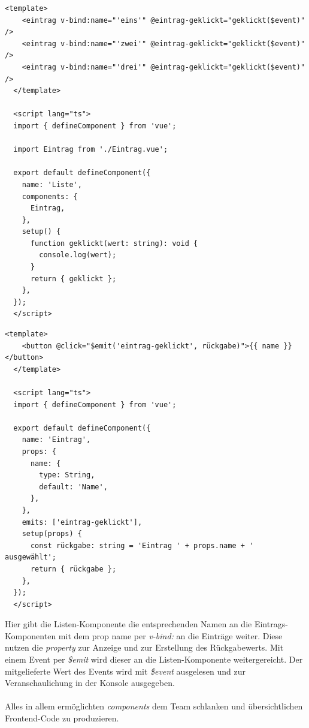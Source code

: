 \documentclass[10pt, a4paper]{article}
\begin{document}
\begin{lstlisting}[caption={beispielhafte Listen-Komponente (Liste.vue)}, captionpos=b, label=lst:Liste]
  <template>
    <eintrag v-bind:name="'eins'" @eintrag-geklickt="geklickt($event)" />
    <eintrag v-bind:name="'zwei'" @eintrag-geklickt="geklickt($event)" />
    <eintrag v-bind:name="'drei'" @eintrag-geklickt="geklickt($event)" />
  </template>

  <script lang="ts">
  import { defineComponent } from 'vue';

  import Eintrag from './Eintrag.vue';

  export default defineComponent({
    name: 'Liste',
    components: {
      Eintrag,
    },
    setup() {
      function geklickt(wert: string): void {
        console.log(wert);
      }
      return { geklickt };
    },
  });
  </script>
\end{lstlisting}

\begin{lstlisting}[caption={beispielhafte Eintrag-Komponente (Eintrag.vue)}, captionpos=b, label=lst:Eintrag]
  <template>
    <button @click="$emit('eintrag-geklickt', rückgabe)">{{ name }}</button>
  </template>

  <script lang="ts">
  import { defineComponent } from 'vue';

  export default defineComponent({
    name: 'Eintrag',
    props: {
      name: {
        type: String,
        default: 'Name',
      },
    },
    emits: ['eintrag-geklickt'],
    setup(props) {
      const rückgabe: string = 'Eintrag ' + props.name + ' ausgewählt';
      return { rückgabe };
    },
  });
  </script>
\end{lstlisting}

Hier gibt die Listen-Komponente die entsprechenden Namen an die Eintrags-Komponenten
 mit dem prop \glqq name\grqq{} per \textit{v-bind:} an die Einträge weiter.
Diese nutzen die \textit{property} zur Anzeige und zur Erstellung des Rückgabewerts.
Mit einem Event per \textit{\$emit} wird dieser an die Listen-Komponente weitergereicht.
Der mitgelieferte Wert des Events wird mit \textit{\$event} ausgelesen und zur Veranschaulichung in der Konsole ausgegeben.
\\~\\
Alles in allem ermöglichten \textit{components} dem Team schlanken und übersichtlichen Frontend-Code zu produzieren.
\end{document}
